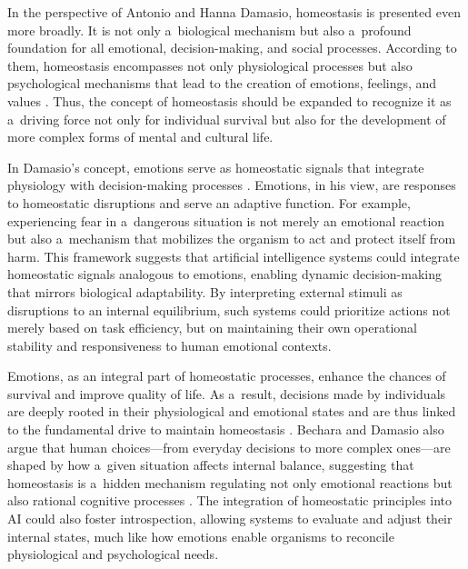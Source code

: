 \documentclass[%
  manuscript=article,
  year=2024,
  volume=77,
  doi=00000.000,
]{zfn}
\begin{document}
In the perspective of Antonio and Hanna Damasio, homeostasis is presented even more broadly. It is not only a~biological mechanism but also a~profound foundation for all emotional, decision-making, and social processes. According to them, homeostasis encompasses not only physiological processes but also psychological mechanisms that lead to the creation of emotions, feelings, and values 
\parencites[][]{korn_maintaining_2015}[][]{damasio_homeostatic_2022}. %
 Thus, the concept of homeostasis should be expanded to recognize it as a~driving force not only for individual survival but also for the development of more complex forms of mental and cultural life.



In Damasio's concept, emotions serve as homeostatic signals that integrate physiology with decision-making processes 
\parencite[][]{damasio_nature_2013}. %
 Emotions, in his view, are responses to homeostatic disruptions and serve an adaptive function. For example, experiencing fear in a~dangerous situation is not merely an emotional reaction but also a~mechanism that mobilizes the organism to act and protect itself from harm. This framework suggests that artificial intelligence systems could integrate homeostatic signals analogous to emotions, enabling dynamic decision-making that mirrors biological adaptability. By interpreting external stimuli as disruptions to an internal equilibrium, such systems could prioritize actions not merely based on task efficiency, but on maintaining their own operational stability and responsiveness to human emotional contexts.



Emotions, as an integral part of homeostatic processes, enhance the chances of survival and improve quality of life. As a~result, decisions made by individuals are deeply rooted in their physiological and emotional states and are thus linked to the fundamental drive to maintain homeostasis 
\parencite[][]{burdakov_reactive_2019}. %
 Bechara and Damasio also argue that human choices---from everyday decisions to more complex ones---are shaped by how a~given situation affects internal balance, suggesting that homeostasis is a~hidden mechanism regulating not only emotional reactions but also rational cognitive processes 
\parencite[][]{bechara_emotion_2000}. %
 The integration of homeostatic principles into AI could also foster introspection, allowing systems to evaluate and adjust their internal states, much like how emotions enable organisms to reconcile physiological and psychological needs.
\end{document}
